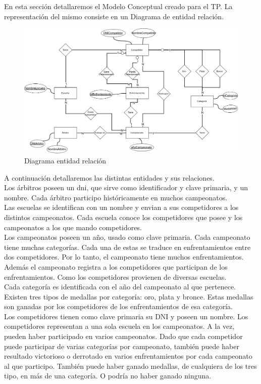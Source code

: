 En esta sección detallaremos el Modelo Conceptual creado para el TP. La representación del mismo consiste en un Diagrama
de entidad relación.

\begin{figure}[H]
  \centering
    \includegraphics[scale=0.4]{imagenes/DER.png}
  \caption{Diagrama entidad relación}
\end{figure}

A continuación detallaremos las distintas entidades y sus relaciones.\\

Los árbitros poseen un dni, que sirve como identificador y clave primaria, y un nombre. Cada árbitro participo históricamente
en muchos campeonatos.\\

Las escuelas se identifican con un nombre y envian a sus competidores a los distintos campeonatos. Cada escuela conoce los competidores
que posee y los campeonatos a los que mando competidores.\\

Los campeonatos poseen un año, usado como clave primaria. Cada campeonato tiene muchas categorías. Cada una de estas se
traduce en enfrentamientos entre dos competidores. Por lo tanto, el campeonato tiene muchos enfrentamientos. Además
el campeonato registra a los competidores que participan de los enfrentamientos. Como los competidores provienen de
diversas escuelas.\\

Cada categoría es identificada con el año del campeonato al que pertenece. Existen tres tipos de medallas por categoría:
oro, plata y bronce. Estas medallas son ganadas por los competidores de los enfrentamientos de esa categoría.\\

Los competidores tienen como clave primaria su DNI y poseen un nombre. Los competidores representan a una sola escuela en
los campeonatos. A la vez, pueden haber participado en varios campeonatos. Dado que cada competidor puede participar
de varias categorías por campeonato, también puede haber resultado victorioso o derrotado en varios enfrentamientos por
cada campeonato al que participo. También puede haber ganado medallas, de cualquiera de los tres tipo, en más de una categoría.
O podría no haber ganado ninguna.\\
